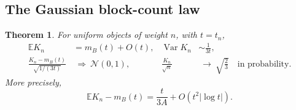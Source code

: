 \documentclass[11pt]{article}
\newtheorem{theorem}{Theorem}[section]
\theoremstyle{remark}\newtheorem{remark}[theorem]{Remark}
\newcommand{\E}{\mathbb E}
\DeclareMathOperator{\Var}{Var}
\begin{document}
\subsection{The Gaussian block-count law}
\begin{theorem}\label{stp:len:thm:clt}
For uniform objects of weight $n$, with $t=t_n$,
\begin{align}
 \E K_n&=m_B(t)+O(t),& \Var K_n&\sim\frac1{3t},\label{stp:len:eq:moments}\\
 \frac{K_n-m_B(t)}{\sqrt{1/(3t)}}&\ \Longrightarrow\ \mathcal N(0,1),&
 \frac{K_n}{\sqrt n}&\ \longrightarrow\ \sqrt{\frac23}
 \quad\text{in probability}.\label{stp:len:eq:clt}
\end{align}
More precisely,
\begin{equation}\label{stp:len:eq:meansharp}
 \E K_n-m_B(t)=\frac{t}{3A}+O(t^2|\log t|).
\end{equation}
\end{theorem}
\end{document}
